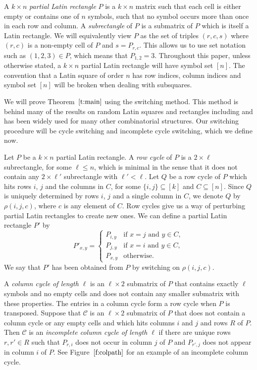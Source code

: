 \documentclass[12pt]{article}
\theoremstyle{definition}
\numberwithin{equation}{section}
\def\tref#1{Theorem~$\ref{#1}$}
\def\fref#1{Figure~$\ref{#1}$}
\renewcommand{\leq}{\leqslant}
\newcommand{\C}{\mathcal{C}}
\begin{document}
	A $k \times n$ \emph{partial Latin rectangle} $P$ is a $k \times n$
	matrix such that each cell is either empty or contains one of $n$
	symbols, such that no symbol occurs more than once in each row and
	column.
	A \emph{subrectangle} of $P$ is a submatrix of $P$ which is itself a
	Latin rectangle. We will equivalently view $P$ as the set of triples
	$(r,c, s)$ where $(r,c)$ is a non-empty cell of $P$ and $s =
	P_{r,c}$. This allows us to use set notation such as $(1, 2, 3) \in
	P$, which means that $P_{1, 2}=3$. Throughout this paper, unless
	otherwise stated, a $k \times n$ partial Latin rectangle will have
	symbol set $[n]$. The convention that a Latin square of order $n$ has
	row indices, column indices and symbol set $[n]$ will be broken when
	dealing with subsquares.
	
	We will prove \tref{t:main} using the switching method. This method is behind many of the results on random Latin squares and rectangles including \cite{cycstrucrandom, subsqrandom, canonicallabel, GM91, KSS, KSSS, KS, manysubsq} and has been widely used for many other combinatorial structures. Our switching procedure will be cycle switching and incomplete cycle switching, which we define now. 
	
	Let $P$ be a $k \times n$ partial Latin rectangle. A \emph{row cycle} of $P$ is a $2 \times \ell$ subrectangle, for some $\ell \leq n$, which is minimal in the sense that it does not contain any $2 \times \ell'$ subrectangle with $\ell' < \ell$. Let $Q$ be a row cycle of $P$ which hits rows $i$, $j$ and the columns in $C$, for some $\{i, j\} \subseteq [k]$ and $C \subseteq [n]$. Since $Q$ is uniquely determined by rows $i$, $j$ and a single column in $C$, we denote $Q$ by $\rho(i, j, c)$, where $c$ is any element of $C$.	
	Row cycles give us a way of perturbing partial Latin rectangles to create new ones. We can define a partial Latin rectangle $P'$ by
	\[
	P'_{x, y} = \begin{cases}
		P_{i, y} & \text{if } x=j \text{ and } y \in C, \\
		P_{j, y} & \text{if } x=i \text{ and } y \in C, \\
		P_{x, y} & \text{otherwise}.
	\end{cases}
	\]
	We say that $P'$ has been obtained from $P$ by switching on $\rho(i, j, c)$. 
	
	A \emph{column cycle of length $\ell$} is an $\ell \times 2$ submatrix
	of $P$ that contains exactly $\ell$ symbols and no empty cells and
	does not contain any smaller submatrix with these properties. The
	entries in a column cycle form a row cycle when $P$ is transposed.
	Suppose that $\C$ is an $\ell \times 2$ submatrix of $P$ that does not
	contain a column cycle or any empty cells and which hits columns $i$
	and $j$ and rows $R$ of $P$. Then $\C$ is an \emph{incomplete column
		cycle of length $\ell$} if there are unique rows $r,r'\in R$ such
	that $P_{r,i}$ does not occur in column $j$ of $P$ and $P_{r',j}$ does
	not appear in column $i$ of $P$.
	See \fref{f:colpath} for an example of an incomplete column cycle.
	
\end{document}
